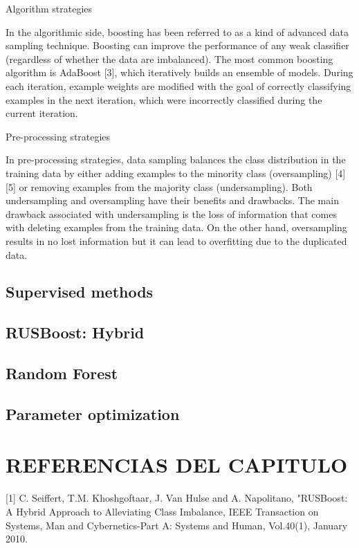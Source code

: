 Algorithm strategies

In the algorithmic side, boosting has been referred to as a kind of advanced data sampling technique. Boosting can improve the performance of any weak classifier (regardless of whether the data are imbalanced). The most common boosting algorithm is AdaBoost [3], which iteratively builds an ensemble of models. During each iteration, example weights are modified with the goal of correctly classifying examples in the next iteration, which were incorrectly classified during the current iteration.

Pre-processing strategies

In pre-processing strategies, data sampling balances the class distribution in the training data by either adding examples to the minority class (oversampling) [4][5] or removing examples from the majority class (undersampling). Both undersampling and oversampling have their benefits and drawbacks. The main drawback associated with undersampling is the loss of information that comes with deleting examples from the training data. On the other hand, oversampling results in no lost information but it can lead to overfitting due to the duplicated data.

\subsection{Supervised methods}

\subsection{RUSBoost: Hybrid}

\subsection{Random Forest}

\subsection{Parameter optimization}


\section{REFERENCIAS DEL CAPITULO}

[1] C. Seiffert, T.M. Khoshgoftaar, J. Van Hulse and A. Napolitano, "RUSBoost: A Hybrid Approach to Alleviating Class Imbalance, IEEE Transaction on Systems, Man and Cybernetics-Part A: Systems and Human, Vol.40(1), January 2010.

